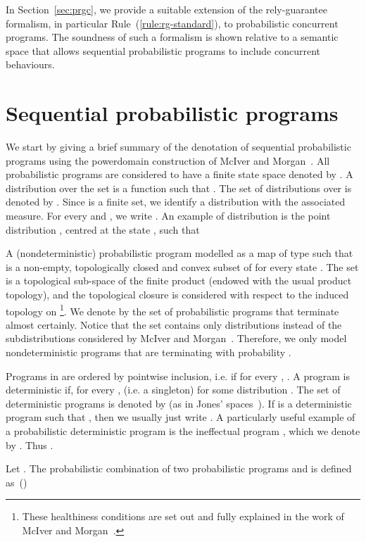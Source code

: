\documentclass[review]{elsart}
\newcommand{\Defs}[1]{Def. #1}
\begin{document}
In Section~\ref{sec:prgc}, we provide a suitable extension of the rely-guarantee formalism, in particular Rule~(\ref{rule:rg-standard}), to probabilistic concurrent programs. The soundness of such a formalism is shown relative to a semantic space that allows sequential probabilistic programs to include concurrent behaviours.

\section{Sequential probabilistic programs}\label{sec:sequential-programs}
We start by giving a brief summary of the denotation of sequential probabilistic programs using the powerdomain construction of McIver and Morgan~\cite{Mci04}. All probabilistic programs are considered to have a finite state space denoted by . A distribution over the set  is a function  such that . The set of distributions over  is denoted by . Since  is a finite set, we identify a distribution with the associated measure. For every  and , we write . An example of distribution is the point distribution , centred at the state , such that

A (nondeterministic) probabilistic program  modelled as a map of type  such that  is a non-empty, topologically closed and convex subset of  for every state . The set  is a topological sub-space of the finite product  (endowed with the usual product topology), and the topological closure is considered with respect to the induced topology on \footnote{These healthiness conditions are set out and fully explained in the work of McIver and Morgan~\cite{Mci04}.}. We denote by  the set of probabilistic programs that terminate almost certainly. Notice that the set  contains only distributions instead of the subdistributions considered by McIver and Morgan~\cite{Mci04}. Therefore, we only model nondeterministic programs that are terminating with probability .

Programs in  are ordered by pointwise inclusion, i.e.  if for every , . A program  is deterministic if, for every ,  (i.e. a singleton) for some distribution . The set of deterministic programs is denoted by  (as in Jones' spaces~\cite{Jon92}). If  is a deterministic program such that , then we usually just write . A particularly useful example of a probabilistic deterministic program is the ineffectual program , which we denote by . Thus .



Let . The probabilistic combination of two probabilistic programs  and  is defined as~(\cite[\Defs{5.4.5}]{Mci04}) 
\end{document}
